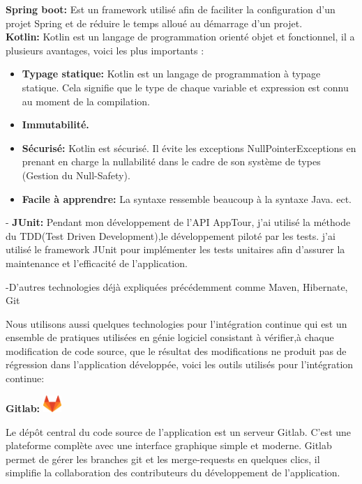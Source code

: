\documentclass[12pt]{article}
\begin{document}
\textbf{Spring boot:} Est un framework utilisé afin de faciliter la configuration d'un projet Spring et de réduire le temps alloué au démarrage d'un projet.\\

\textbf{Kotlin:} Kotlin est un langage de programmation orienté objet et fonctionnel, il a plusieurs avantages, voici les plus importants :
\begin{itemize}
\item \textbf{Typage statique: } Kotlin est un langage de programmation à typage statique. Cela signifie que le type de chaque variable et expression est connu au moment de la compilation.
\item \textbf{Immutabilité.} 
\item \textbf{Sécurisé: } Kotlin est sécurisé. Il évite les exceptions NullPointerExceptions en prenant en charge la nullabilité dans le cadre de son système de types (Gestion du Null-Safety).
\item \textbf{Facile à apprendre: } La syntaxe ressemble beaucoup à la syntaxe Java.
ect.
\end{itemize} 

- \textbf{JUnit:} Pendant mon développement de l'API AppTour, j'ai utilisé la méthode du TDD(Test Driven Development),le développement piloté par les tests. j'ai utilisé le framework JUnit pour implémenter les tests unitaires afin d'assurer la maintenance et l'efficacité de l’application.

-D'autres technologies déjà expliquées précédemment comme Maven, Hibernate, Git

Nous utilisons aussi quelques technologies pour l'intégration continue qui est un ensemble de pratiques utilisées en génie logiciel consistant à vérifier,à chaque modification de code source, que le résultat des modifications ne produit pas de régression dans l’application développée, voici les outils utilisés pour l'intégration continue: 

\textbf{Gitlab:} \includegraphics[width=7mm,scale=0.5]{diagrammes/gitlab.png}

Le dépôt central du code source de l’application est un serveur Gitlab. C’est une plateforme complète avec une interface graphique simple et moderne. Gitlab permet de gérer les branches git et les merge-requests en quelques clics, il simplifie la collaboration des contributeurs du développement de l’application. 
\end{document}
